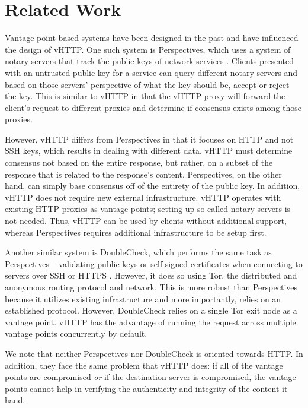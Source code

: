 \section{Related Work}
\label{sec:related}

Vantage point-based systems have been designed in the past and have influenced
the design of vHTTP. One such system is Perspectives, which uses a system of
notary servers that track the public keys of network services
\cite{Perspectives}. Clients presented with an untrusted public key for a
service can query different notary servers and based on those servers'
perspective of what the key should be, accept or reject the key. This is
similar to vHTTP in that the vHTTP proxy will forward the client's request to
different proxies and determine if consensus exists among those proxies.

However, vHTTP differs from Perspectives in that it focuses on HTTP and not
SSH keys, which results in dealing with different data. vHTTP must determine
consensus not based on the entire response, but rather, on a subset of the
response that is related to the response's content. Perspectives, on the other
hand, can simply base consensus off of the entirety of the public key. In
addition, vHTTP does not require new external infrastructure. vHTTP operates
with existing HTTP proxies as vantage points; setting up so-called notary
servers is not needed. Thus, vHTTP can be used by clients without additional
support, whereas Perspectives requires additional infrastructure to be setup
first.

Another similar system is DoubleCheck, which performs the same task as
Perspectives – validating public keys or self-signed certificates when
connecting to servers over SSH or HTTPS \cite{DoubleCheck}. However, it does
so using Tor, the distributed and anonymous routing protocol and network. This
is more robust than Perspectives because it utilizes existing infrastructure
and more importantly, relies on an established protocol. However, DoubleCheck
relies on a single Tor exit node as a vantage point. vHTTP has the advantage of
running the request across multiple vantage points concurrently by default.

We note that neither Perspectives nor DoubleCheck is oriented towards HTTP. In
addition, they face the same problem that vHTTP does: if all of the vantage
points are compromised \emph{or} if the destination server is compromised, the
vantage points cannot help in verifying the authenticity and integrity of the
content it hand.
